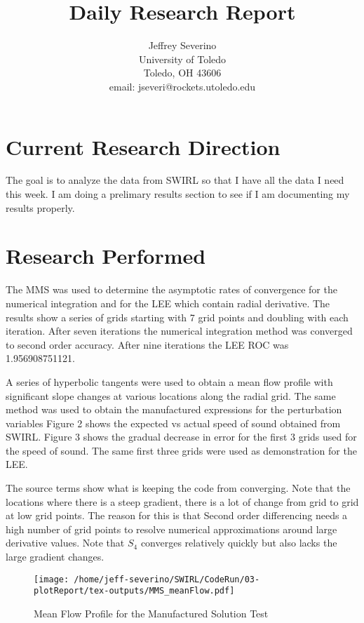 \documentclass[a4paper]{article}
\begin{document}
\begin{titlepage}

    \title{
    Daily Research Report}

    \author{ Jeffrey Severino \\
        University of Toledo \\
        Toledo, OH  43606 \\
    email: jseveri@rockets.utoledo.edu}


    \maketitle

\end{titlepage}
\section{Current Research Direction}
The goal is to analyze the data from SWIRL so that I have all the data I need this week. 
I am doing a prelimary results section to see if I am documenting my results properly.
\section{Research Performed}
The MMS was used to determine the asymptotic rates of convergence for the numerical
integration and for the LEE which contain radial derivative. The results show 
a series of grids starting with 7 grid points and doubling with each iteration.
After seven iterations the numerical integration method was converged to second
order accuracy. After nine iterations the LEE ROC was 1.956908751121.  

A series of hyperbolic tangents were used to obtain a mean flow profile with
significant slope changes at various locations along the radial grid. The same 
method was used to obtain the manufactured expressions for the perturbation variables
Figure 2 shows the expected vs actual speed of sound obtained from SWIRL. Figure 3
shows the gradual decrease in error for the first 3 grids used for the speed of sound.
The same first three grids were used as demonstration for the LEE.  

The source terms show what is keeping the code from converging. Note that the locations
where there is a steep gradient, there is a lot of change from grid to grid 
at low grid points. The reason for this is that Second order differencing needs
a high number of grid points to resolve numerical approximations around large derivative 
values. Note that $S_4$ converges relatively quickly but also lacks the large gradient
changes.
 \begin{figure}
     \centering
     \texttt{[image: /home/jeff-severino/SWIRL/CodeRun/03-plotReport/tex-outputs/MMS\_meanFlow.pdf]}
     \caption{Mean Flow Profile for the Manufactured Solution Test}
 \end{figure}
\end{document}
